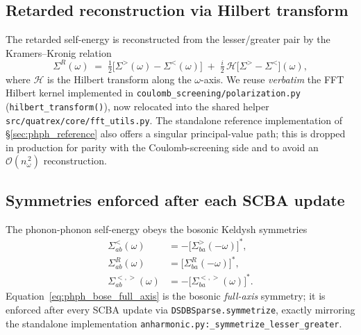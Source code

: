 \subsection{Retarded reconstruction via Hilbert transform}
\label{sec:phph_retarded}

The retarded self-energy is reconstructed from the lesser/greater pair by
the Kramers--Kronig relation
\begin{equation}\label{eq:phph_KK}
  \Sigma^{R}(\omega)
  \;=\;
  \tfrac12\bigl[\Sigma^{>}(\omega) - \Sigma^{<}(\omega)\bigr]
  \;+\;
  \tfrac{i}{2}\,\mathcal H\!\bigl[\Sigma^{>} - \Sigma^{<}\bigr](\omega),
\end{equation}
where $\mathcal H$ is the Hilbert transform along the $\omega$-axis. We
reuse \emph{verbatim} the FFT Hilbert kernel implemented in
\texttt{coulomb\_screening/polarization.py}
(\texttt{hilbert\_transform()}), now relocated into the shared helper
\texttt{src/quatrex/core/fft\_utils.py}. The standalone reference
implementation of \S\ref{sec:phph_reference} also offers a singular
principal-value path; this is dropped in production for parity with the
Coulomb-screening side and to avoid an $\mathcal O(n_\omega^{\,2})$
reconstruction.

\subsection{Symmetries enforced after each SCBA update}
\label{sec:phph_symmetries}

The phonon-phonon self-energy obeys the bosonic Keldysh symmetries
\begin{align}
  \Sigma^{<}_{ab}(\omega)   &= -\bigl[\Sigma^{>}_{ba}(-\omega)\bigr]^{*},
  \label{eq:phph_bose_full_axis}\\
  \Sigma^{R}_{ab}(\omega)   &= \bigl[\Sigma^{R}_{ba}(-\omega)\bigr]^{*},
  \\
  \Sigma^{<,>}_{ab}(\omega) &= -\bigl[\Sigma^{<,>}_{ba}(\omega)\bigr]^{*}.
\end{align}
Equation~\eqref{eq:phph_bose_full_axis} is the bosonic
\emph{full-axis} symmetry; it is enforced after every SCBA update via
\texttt{DSDBSparse.symmetrize}, exactly mirroring the standalone
implementation
\texttt{anharmonic.py:\_symmetrize\_lesser\_greater}.

